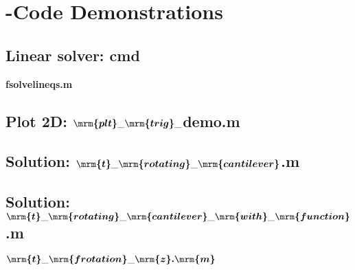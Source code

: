 \section*{\matl-Code Demonstrations}

\subsection*{Linear solver: cmd}



\textbf{fsolvelineqs.m}




\subsection*{Plot 2D: $\boldsymbol{\mrm{plt}\_\mrm{trig}\_}$demo.m}





\subsection*{Solution: $\boldsymbol{\mrm{t}\_\mrm{rotating}\_\mrm{cantilever}}$.m}





\subsection*{Solution: $\boldsymbol{\mrm{t}\_\mrm{rotating}\_\mrm{cantilever}\_\mrm{with}\_\mrm{function}}$.m}



$\boldsymbol{\mrm{t}\_\mrm{frotation}\_\mrm{z}.\mrm{m}}$





